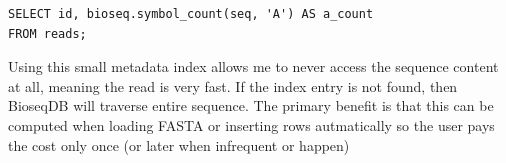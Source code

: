 \begin{lstlisting}[style=bioseq-index-sql,
  caption={Request a symbol count for each stored sequence.},
  label={lst:index-symbol-counts}]
SELECT id, bioseq.symbol_count(seq, 'A') AS a_count
FROM reads;
\end{lstlisting}
Using this small metadata index allows me to never access the sequence content at all, meaning the read is very fast.
If the index entry is not found, then BioseqDB will traverse entire sequence.
The primary benefit is that this can be computed when loading FASTA or inserting rows autmatically so the user pays the 
cost only once (or later when infrequent  or  happen)
